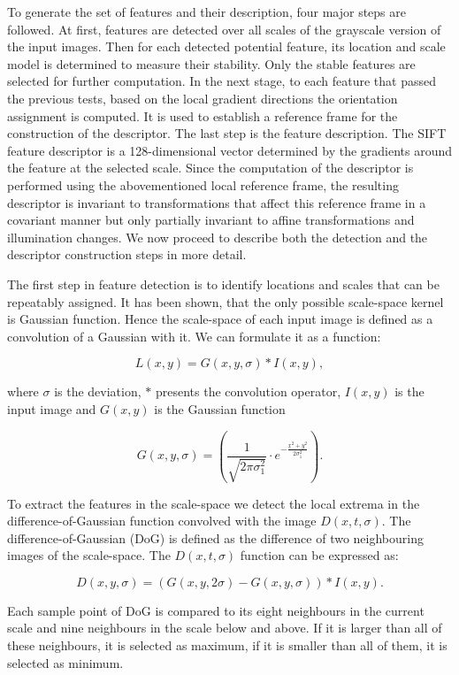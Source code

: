 To generate the set of features and their description, four major steps are followed.
At first, features are detected over all scales of the grayscale version of the input images.
Then for each detected potential feature, its location and scale model is determined to measure their stability.
Only the stable features are selected for further computation.
In the next stage, to each feature that passed the previous tests, based on the local gradient directions the orientation assignment is computed.
It is used to establish a reference frame for the construction of the descriptor.
The last step is the feature description.
The SIFT feature descriptor is a 128-dimensional vector determined by the gradients around the feature at the selected scale. 
Since the computation of the descriptor is performed using the abovementioned local reference frame, 
the resulting descriptor is invariant to transformations that affect this reference frame in a covariant manner but only partially invariant to affine transformations and illumination changes.
We now proceed to describe both the detection and the descriptor construction steps in more detail.

The first step in feature detection is to identify locations and scales that can be repeatably assigned.
It has been shown, that the only possible scale-space kernel is Gaussian function.
Hence the scale-space of each input image is defined as a convolution of a Gaussian with it.
We can formulate it as a function:

\[
L(x, y) = G(x, y, \sigma) * I(x, y),
\]

where $\sigma$ is the deviation, $*$ presents the convolution operator, $I(x, y)$ is the input image and $G(x, y)$ is the Gaussian function

\[
 G(x, y, \sigma) = \left( \frac{1}{\sqrt{2\pi \sigma _1^{2}}} \cdot e^{-\frac{x^{2}+y^{2}}{2\sigma_1^{2}} } \right).
\]

To extract the features in the scale-space we detect the local extrema in the difference-of-Gaussian function convolved with the image $D(x, t, \sigma)$.
The difference-of-Gaussian (DoG) is defined as the difference of two neighbouring images of the scale-space.
The $D(x, t, \sigma)$ function can be expressed as:

\[
 D(x, y, \sigma) =  (G(x, y, 2\sigma) -  G(x, y, \sigma)) *  I(x, y).
\]


Each sample point of DoG is compared to its eight neighbours in the current scale and nine neighbours in the scale below and above.
If it is larger than all of these neighbours, it is selected as maximum, if it is smaller than all of them, it is selected as minimum. 

